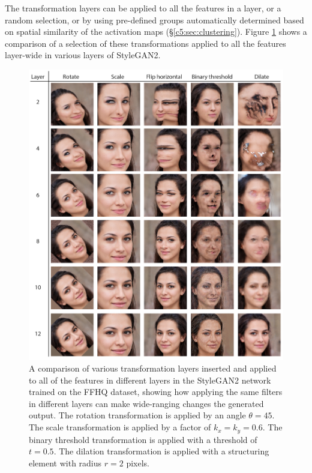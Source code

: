  The transformation layers can be applied to all the features in a layer, or a random selection, or by using pre-defined groups automatically determined based on spatial similarity of the activation maps (\S \ref{c5:sec:clustering}). 
 Figure \ref{fig:c5:layerwide_comparison} shows a comparison of a selection of these transformations applied to all the features layer-wide in various layers of StyleGAN2.

\begin{figure}[htbp]
    \centering
    \includegraphics[width=1\textwidth]{figures/c5_netbend/misc/transform-comparison.png}
    \caption[Comparsion of various transformation layers applied in different layers of StyleGAN2]{A comparison of various transformation layers inserted and applied to all of the features in different layers in the StyleGAN2 network trained on the FFHQ dataset, showing how applying the same filters in different layers can make wide-ranging changes the generated output. The rotation transformation is applied by an angle $\theta=45$. The scale transformation is applied by a factor of $k_{x}=k_{y}=0.6$. The binary threshold transformation is applied with a threshold of $t=0.5$. The dilation transformation is applied with a structuring element with radius $r=2$ pixels.}
    \label{fig:c5:layerwide_comparison}
\end{figure}


